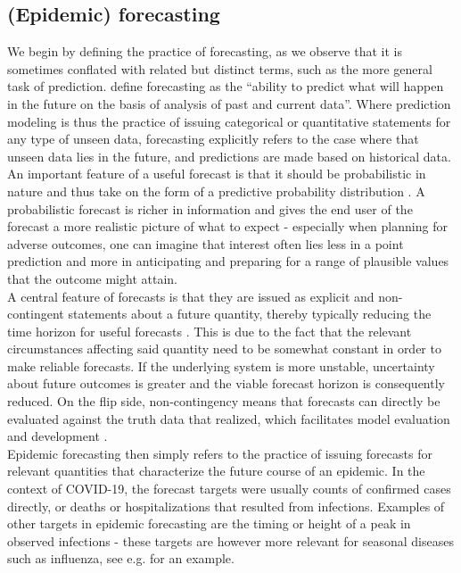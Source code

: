 \subsection{(Epidemic) forecasting} \label{sub:ep_forecasting}
We begin by defining the practice of forecasting, as we observe that it is sometimes conflated with related but distinct terms, such as the more general task of prediction. \cite{moran_epidemic_2016} define forecasting as the ``ability to predict what will happen in the future on the basis of analysis of past and current data''. Where prediction modeling is thus the practice of issuing categorical or quantitative statements for any type of unseen data, forecasting explicitly refers to the case where that unseen data lies in the future, and predictions are made based on historical data.\\
An important feature of a useful forecast is that it should be probabilistic in nature and thus take on the form of a predictive probability distribution \citep{gneiting_probabilistic_2007}. A probabilistic forecast is richer in information and gives the end user of the forecast a more realistic picture of what to expect - especially when planning for adverse outcomes, one can imagine that interest often lies less in a point prediction and more in anticipating and preparing for a range of plausible values that the outcome might attain.\\
A central feature of forecasts is that they are issued as explicit and non-contingent statements about a future quantity, thereby typically reducing the time horizon for useful forecasts \citep{reich_collaborative_2022}. This is due to the fact that the relevant circumstances affecting said quantity need to be somewhat constant in order to make reliable forecasts. If the underlying system is more unstable, uncertainty about future outcomes is greater and the viable forecast horizon is consequently reduced. On the flip side, non-contingency means that forecasts can directly be evaluated against the truth data that realized, which facilitates model evaluation and development \citep{reich_collaborative_2022}. \medskip\\
Epidemic forecasting then simply refers to the practice of issuing forecasts for relevant quantities that characterize the future course of an epidemic. In the context of COVID-19, the forecast targets were usually counts of confirmed cases directly, or deaths or hospitalizations that resulted from infections. Examples of other targets in epidemic forecasting are the timing or height of a peak in observed infections - these targets are however more relevant for seasonal diseases such as influenza, see e.g. \cite{reich_collaborative_2019} for an example.
